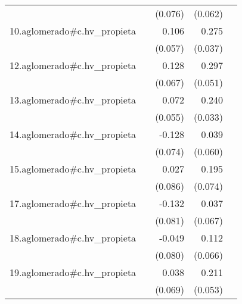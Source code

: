 {\begin{longtable}{l*{4}{D{.}{.}{-1}}}
            &                     &     (0.076)         &     (0.062)         &                     \\
\addlinespace
10.aglomerado#c.hv\_propieta&                     &       0.106         &       0.275\sym{***}&                     \\
            &                     &     (0.057)         &     (0.037)         &                     \\
\addlinespace
12.aglomerado#c.hv\_propieta&                     &       0.128         &       0.297\sym{***}&                     \\
            &                     &     (0.067)         &     (0.051)         &                     \\
\addlinespace
13.aglomerado#c.hv\_propieta&                     &       0.072         &       0.240\sym{***}&                     \\
            &                     &     (0.055)         &     (0.033)         &                     \\
\addlinespace
14.aglomerado#c.hv\_propieta&                     &      -0.128         &       0.039         &                     \\
            &                     &     (0.074)         &     (0.060)         &                     \\
\addlinespace
15.aglomerado#c.hv\_propieta&                     &       0.027         &       0.195\sym{**} &                     \\
            &                     &     (0.086)         &     (0.074)         &                     \\
\addlinespace
17.aglomerado#c.hv\_propieta&                     &      -0.132         &       0.037         &                     \\
            &                     &     (0.081)         &     (0.067)         &                     \\
\addlinespace
18.aglomerado#c.hv\_propieta&                     &      -0.049         &       0.112         &                     \\
            &                     &     (0.080)         &     (0.066)         &                     \\
\addlinespace
19.aglomerado#c.hv\_propieta&                     &       0.038         &       0.211\sym{***}&                     \\
            &                     &     (0.069)         &     (0.053)         &                     \\

\end{longtable}}
